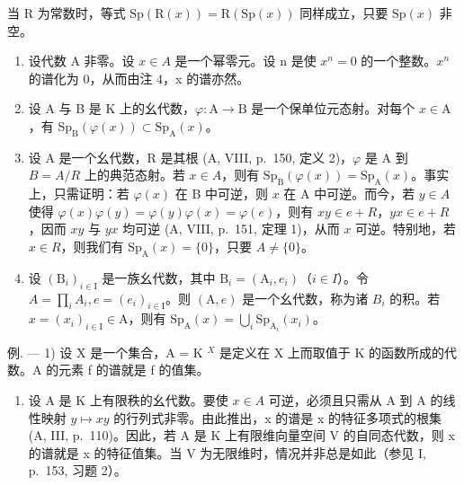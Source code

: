 当 R 为常数时，等式 \(\mathrm{Sp}(\mathrm{R}(x)) = \mathrm{R}(\mathrm{Sp}(x))\) 同样成立，只要 \(\mathrm{Sp}(x)\) 非空。

\begin{enumerate}
\def\labelenumi{\arabic{enumi})}
\setcounter{enumi}{4}
\item
  设代数 A 非零。设 \(x \in A\) 是一个幂零元。设 n 是使 \(x^{n} = 0\) 的一个整数。\(x^{n}\) 的谱化为 0，从而由注 4，x 的谱亦然。
\item
  设 A 与 B 是 K 上的幺代数，\(\varphi\colon\mathrm{A}\to\mathrm{B}\) 是一个保单位元态射。对每个 \(x\in\mathrm{A}\)，有 \(\mathrm{Sp}_{\mathrm{B}}(\varphi(x))\subset\mathrm{Sp}_{\mathrm{A}}(x)\)。
\item
  设 A 是一个幺代数，R 是其根 (A, VIII, p.~150, 定义 2)，\(\varphi\) 是 A 到 \(B = A/R\) 上的典范态射。若 \(x \in A\)，则有 \(\mathrm{Sp}_{\mathrm{B}}(\varphi(x)) = \mathrm{Sp}_{\mathrm{A}}(x)\)。事实上，只需证明：若 \(\varphi(x)\) 在 B 中可逆，则 \(x\) 在 A 中可逆。而今，若 \(y \in A\) 使得 \(\varphi(x)\varphi(y) = \varphi(y)\varphi(x) = \varphi(e)\)，则有 \(xy \in e + R\)，\(yx \in e + R\)，因而 \(xy\) 与 \(yx\) 均可逆 (A, VIII, p.~151, 定理 1)，从而 \(x\) 可逆。特别地，若 \(x \in R\)，则我们有 \(\mathrm{Sp}_{\mathrm{A}}(x) = \{0\}\)，只要 \(A \neq \{0\}\)。
\item
  设 \((\mathrm{B}_{i})_{i\in\mathrm{I}}\) 是一族幺代数，其中 \(\mathrm{B}_{i}=(\mathrm{A}_{i},e_{i})\)（\(i\in I\)）。令 \(A=\prod_{i}A_{i}, e=(e_{i})_{i\in\mathrm{I}}\)。则 \((\mathrm{A},e)\) 是一个幺代数，称为诸 \(B_{i}\) 的积。若 \(x=(x_{i})_{i\in\mathrm{I}}\in\mathrm{A}\)，则有 \(\mathrm{Sp}_{\mathrm{A}}(x)=\bigcup_{i}\mathrm{Sp}_{\mathrm{A}_{i}}(x_{i})\)。
\end{enumerate}

例. --- 1) 设 X 是一个集合，A = K \(^{X}\) 是定义在 X 上而取值于 K 的函数所成的代数。A 的元素 f 的谱就是 f 的值集。

\begin{enumerate}
\def\labelenumi{\arabic{enumi})}
\setcounter{enumi}{1}
\tightlist
\item
  设 A 是 K 上有限秩的幺代数。要使 \(x \in A\) 可逆，必须且只需从 A 到 A 的线性映射 \(y \mapsto xy\) 的行列式非零。由此推出，x 的谱是 x 的特征多项式的根集 (A, III, p.~110)。因此，若 A 是 K 上有限维向量空间 V 的自同态代数，则 x 的谱就是 x 的特征值集。当 V 为无限维时，情况并非总是如此（参见 I, p.~153, 习题 2）。
\end{enumerate}

